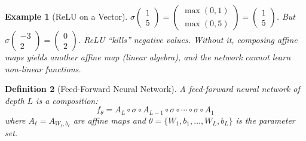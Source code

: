 \documentclass[10pt,twocolumn]{article}
\newtheorem{definition}{Definition}[section]
\newtheorem{example}[definition]{Example}
\begin{document}
\begin{example}[ReLU on a Vector]
$\sigma\begin{pmatrix} 1 \\ 5 \end{pmatrix} = \begin{pmatrix} \max(0,1) \\ \max(0,5) \end{pmatrix} = \begin{pmatrix} 1 \\ 5 \end{pmatrix}$. But $\sigma\begin{pmatrix} -3 \\ 2 \end{pmatrix} = \begin{pmatrix} 0 \\ 2 \end{pmatrix}$. ReLU ``kills'' negative values. Without it, composing affine maps yields another affine map (linear algebra), and the network cannot learn non-linear functions.
\end{example}

\begin{definition}[Feed-Forward Neural Network]
A feed-forward neural network of depth $L$ is a composition:
\begin{equation}
f_\theta = A_L \circ \sigma \circ A_{L-1} \circ \sigma \circ \cdots \circ \sigma \circ A_1
\end{equation}
where $A_\ell = A_{W_\ell, b_\ell}$ are affine maps and $\theta = \{W_1, b_1, \ldots, W_L, b_L\}$ is the parameter set.
\end{definition}
\end{document}
